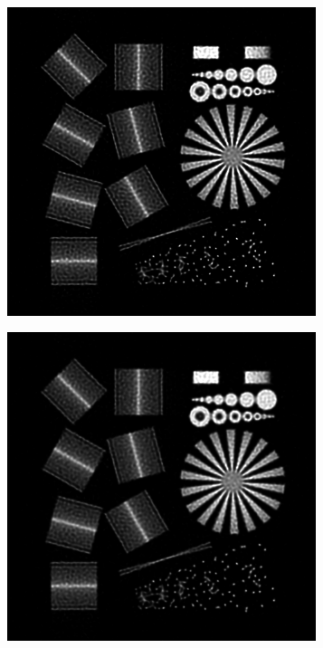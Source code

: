 \documentclass{juliacon}
\begin{document}
\begin{figure}[h]
\begin{subfigure}[b]{.16\textwidth}
                \caption{}
                \label{fig:fabiob}
            \end{subfigure}%
            \hfill
            \begin{subfigure}[b]{.16\textwidth}
                \centering
                \includegraphics[width=0.99\textwidth]{figures/resolution_test_chart_no_reg_iter_10.png}
                \caption{}
                \label{fig:fabioc}
            \end{subfigure}%
            \begin{subfigure}[b]{.16\textwidth}
                \centering
                \includegraphics[width=0.99\textwidth]{figures/resolution_test_chart_regularizer_008_iter_21.png}

\end{subfigure}
\end{figure}
\end{document}

